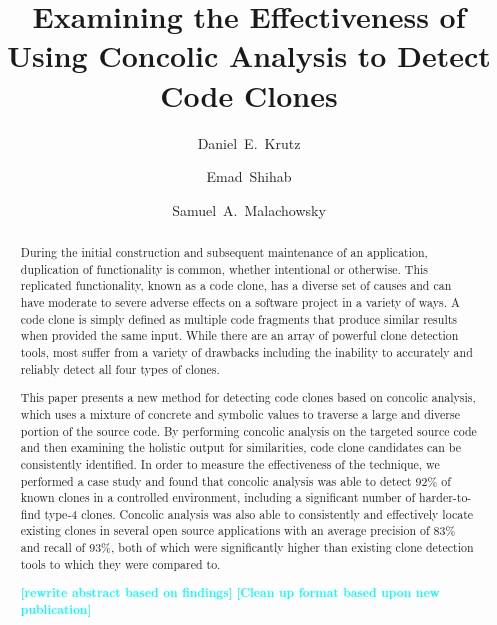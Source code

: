 \documentclass[smallextended]{svjour3}       %
\newcommand{\todo}[1]{\textcolor{cyan}{\textbf{[#1]}}}
\begin{document}
\title{Examining the Effectiveness of Using Concolic Analysis to Detect Code Clones}


\author{Daniel~E.~Krutz \and
        Emad~Shihab \and
        Samuel~A.~Malachowsky
}




\maketitle
\begin{abstract}
During the initial construction and subsequent maintenance of an application, duplication of functionality is common, whether intentional or otherwise. This replicated functionality, known as a code clone, has a diverse set of causes and can have moderate to severe adverse effects on a software project in a variety of ways. A code clone is simply defined as multiple code fragments that produce similar results when provided the same input. While there are an array of powerful clone detection tools, most suffer from a variety of drawbacks including the inability to accurately and reliably detect all four types of clones.

This paper presents a new method for detecting code clones based on concolic analysis, which uses a mixture of concrete and symbolic values to traverse a large and diverse portion of the source code. By performing concolic analysis on the targeted source code and then examining the holistic output for similarities, code clone candidates can be consistently identified. In order to measure the effectiveness of the technique, we performed a case study and found that concolic analysis was able to detect 92\% of known clones in a controlled environment, including a significant number of harder-to-find type-4 clones. Concolic analysis was also able to consistently and effectively locate existing clones in several open source applications with an average precision of 83\% and recall of 93\%, both of which were significantly higher than existing clone detection tools to which they were compared to.

\todo{rewrite abstract based on findings}
\todo{Clean up format based upon new publication}


\end{abstract}
\end{document}
